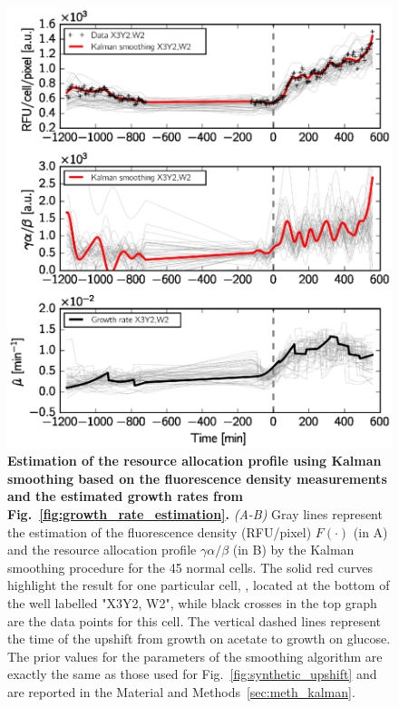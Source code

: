 \begin{figure}[p]
\centering
\includegraphics[scale=1]{./Fig/gene_activity}
\caption{
\textbf{Estimation of the resource allocation profile using Kalman smoothing based on the fluorescence density measurements and the estimated growth rates from Fig.~\ref{fig:growth_rate_estimation}.}
\textit{(A-B)} Gray lines represent the estimation of the fluorescence density (RFU/pixel) $F(\cdot)$ (in A) and the resource allocation profile $\gamma \alpha / \beta$ (in B) by the Kalman smoothing procedure for the 45 normal cells.
The solid red curves highlight the result for one particular cell, , located at the bottom of the well labelled "X3Y2, W2", while black crosses in the top graph are the data points for this cell.
The vertical dashed lines represent the time of the upshift from growth on acetate to growth on glucose.
The prior values for the parameters of the smoothing algorithm are exactly the same as those used for Fig.~\ref{fig:synthetic_upshift} and are reported in the Material and Methods~\ref{sec:meth_kalman}.
}
\label{fig:gene_activity}
\end{figure}

